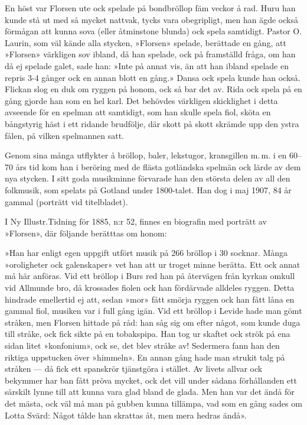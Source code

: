 En höst var Florsen ute ock spelade på bondbröllop fäm veckor å rad. Huru han kunde stå ut med så mycket nattvak, tycks vara obegripligt, men han ägde också förmågan att kunna sova (eller åtminstone blunda) ock spela samtidigt. Pastor O. Laurin, som väl kände alla stycken, »Florsen» spelade, berättade en gång, att »Florsen» värkligen sov ibland, då han spelade, ock på framställd fråga, om han då ej spelade galet, sade han: »Inte på annat vis, än att han ibland spelade en repris 3-4 gånger ock en annan blott en gång.» Dansa ock spela kunde han också. Flickan slog en duk om ryggen på honom, ock så bar det av. Rida ock spela på en gång gjorde han som en hel karl. Det behövdes värkligen skicklighet i detta avseende för en spelman att samtidigt, som han skulle spela fiol, sköta en bångstyrig häst i ett ridande brudfölje, där skott på skott skrämde upp den ystra fålen, på vilken spelmannen satt. 

Genom sina många utflykter å bröllop, baler, lekstugor, kransgillen m.\,m. i en 60--70 års tid kom han i beröring med de flästa gotländska spelmän ock lärde av dem nya stycken. I sitt goda musikminne förvarade han den största delen av all den folkmusik, som spelats på Gotland under 1800-talet. Han dog i maj 1907, 84 år gammal (porträtt vid titelbladet). 

I Ny Illustr.\@ Tidning för 1885, n:r 52, finnes en biografin med porträtt av »Florsen», där följande berätttas om honom: 

»Han har enligt egen uppgift utfört musik på 266 bröllop i 30 socknar. Många »oroligheter ock galenskaper» vet han att ur troget minne berätta. Ett ock annat må här anföras. Vid ett bröllop i Burs red han på återvägen från kyrkan omkull vid Allmunde bro, då krossades fiolen ock han fördärvade alldeles ryggen. Detta hindrade emellertid ej att, sedan »mor» fått smörja ryggen ock han fått låna en gammal fiol, musiken var i full gång igän. Vid ett bröllop i Levide hade man gömt stråken, men Florsen hittade på råd: han såg sig om efter något, som kunde duga till stråke, ock fick sikte på en tobakspipa. Han tog ur skaftet ock strök på ena sidan litet »konfonium», ock se, det blev stråke av! Sedermera fann han den riktiga uppstucken över »himmeln». En annan gång hade man strukit talg på stråken --- då fick ett spanskrör tjänstgöra i stället. Av livets allvar ock bekymmer har ban fått pröva mycket, ock det vill under sådana förhållanden ett särskilt lynne till att kunna vara glad bland de glada. Men han var det ändå för det mästa, ock väl må man på gubben kunna tillämpa, vad som en gång sades om Lotta Svärd: Något tålde han skrattas åt, men mera hedras ändå». 

